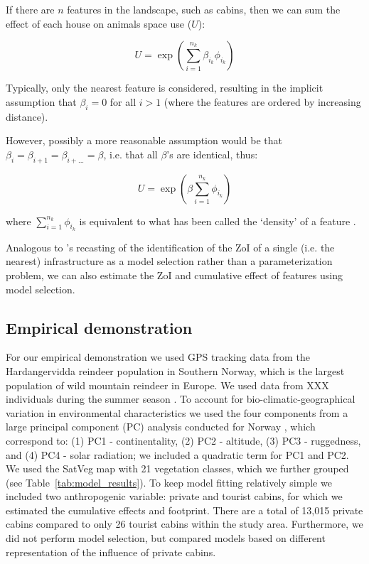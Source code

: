 \documentclass{article}
\begin{document}
If there are $n$ features in the landscape, such as cabins, then we can sum the effect of each house on animals space use ($U$):

\begin{equation}
    U = \exp(\sum_{i=1}^{n_k} \beta_{i_k} \phi_{i_k})
\end{equation}

Typically, only the nearest feature is considered, resulting in the implicit assumption that $\beta_i = 0$ for all $i > 1$ (where the features are ordered by increasing distance).

However, possibly a more reasonable assumption would be that  $\beta_i = \beta_{i+1} = \beta_{i+...} = \beta$, i.e. that all $\beta$'s are identical, thus:

\begin{equation}
    U = \exp(\beta \sum_{i=1}^{n_k} \phi_{i_k})
\end{equation}

where $\sum_{i=1}^{n_k} \phi_{i_k}$ is equivalent to what has been called the `density' of a feature \citep[e.g.][]{panzacchi2015searching}.

Analogous to \citet{lee2020estimating}'s recasting of the identification of the ZoI of a single (i.e. the nearest) infrastructure as a model selection rather than a parameterization problem, we can also estimate the ZoI and cumulative effect of features using model selection. 

\subsection{Empirical demonstration}

For our empirical demonstration we used GPS tracking data from the Hardangervidda reindeer population in Southern Norway, which is the largest population of wild mountain reindeer in Europe. We used data from XXX individuals during the summer season \citep[see][for further details]{panzacchi2015searching}.
To account for bio-climatic-geographical variation in environmental characteristics we used the four components from a large principal component (PC) analysis conducted for Norway \citep{bakkestuen2008step}, which correspond to: (1) PC1 - continentality, (2) PC2 - altitude, (3) PC3 - ruggedness, and (4) PC4 - solar radiation; we included a quadratic term for PC1 and PC2. We used the SatVeg map with 21 vegetation classes, which we further grouped (see Table~\ref{tab:model_results}). To keep model fitting relatively simple we included two anthropogenic variable: private and tourist cabins, for which we estimated the cumulative effects and footprint. There are a total of 13,015 private cabins compared to only 26 tourist cabins within the study area. Furthermore, we did not perform model selection, but compared models based on different representation of the influence of private cabins.
\end{document}
